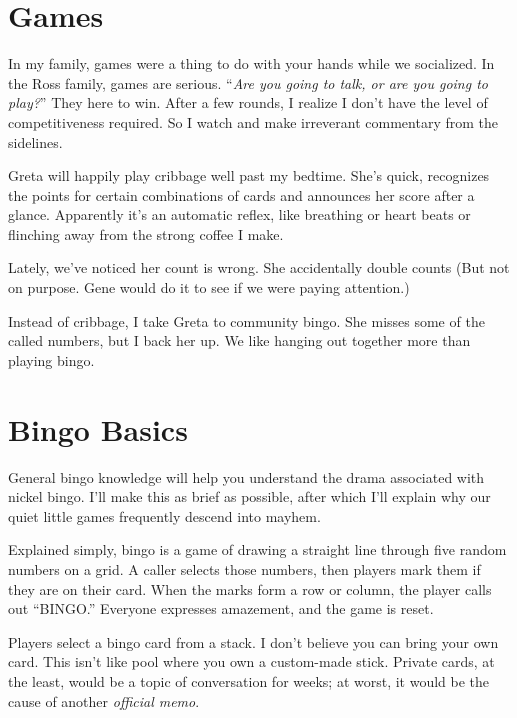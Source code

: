 \documentclass[
  letterpaper,
  DIV=11,
  numbers=noendperiod]{scrreprt}
\begin{document}
\section*{Games}\label{games}


In my family, games were a thing to do with your hands while we
socialized. In the Ross family, games are serious. ``\emph{Are you going
to talk, or are you going to play?}'' They here to win. After a few
rounds, I realize I don't have the level of competitiveness required. So
I watch and make irreverant commentary from the sidelines.

Greta will happily play cribbage well past my bedtime. She's quick,
recognizes the points for certain combinations of cards and announces
her score after a glance. Apparently it's an automatic reflex, like
breathing or heart beats or flinching away from the strong coffee I
make.

Lately, we've noticed her count is wrong. She accidentally double counts
(But not on purpose. Gene would do it to see if we were paying
attention.)

Instead of cribbage, I take Greta to community bingo. She misses some of
the called numbers, but I back her up. We like hanging out together more
than playing bingo.

\section*{Bingo Basics}\label{bingo-basics}


General bingo knowledge will help you understand the drama associated
with nickel bingo. I'll make this as brief as possible, after which I'll
explain why our quiet little games frequently descend into mayhem.

Explained simply, bingo is a game of drawing a straight line through
five random numbers on a grid. A caller selects those numbers, then
players mark them if they are on their card. When the marks form a row
or column, the player calls out ``BINGO.'' Everyone expresses amazement,
and the game is reset.

Players select a bingo card from a stack. I don't believe you can bring
your own card. This isn't like pool where you own a custom-made stick.
Private cards, at the least, would be a topic of conversation for weeks;
at worst, it would be the cause of another \emph{official memo}.
\end{document}
